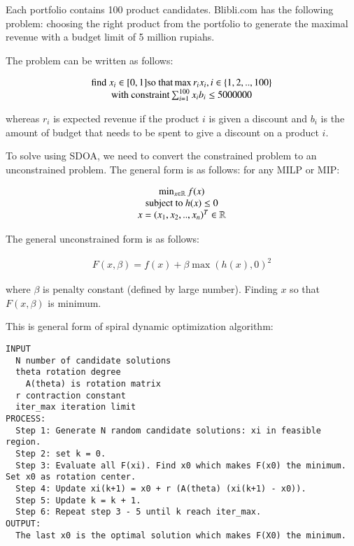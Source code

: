 \documentclass[preprint, 3p,
authoryear]{elsarticle} %
\begin{document}
Each portfolio contains 100 product candidates. Blibli.com has the
following problem: choosing the right product from the portfolio to
generate the maximal revenue with a budget limit of 5 million rupiahs.

The problem can be written as follows:

\begin{align}
\begin{matrix} 
\text{find }x_i \in [0,1] \space \text{so that} \space \max{r_i x_i}, \space i \in \{1,2,..,100\} \\
\text{with constraint} \space \sum_{i = 1}^{100}x_i b_i \leq 5000000
\end{matrix} 
\end{align}

whereas \(r_i\) is expected revenue if the product \(i\) is given a
discount and \(b_i\) is the amount of budget that needs to be spent to
give a discount on a product \(i\).

To solve using SDOA, we need to convert the constrained problem to an
unconstrained problem. The general form is as follows: for any MILP or
MIP:

\begin{align}
\begin{matrix} 
\min_{x \in \mathbb{R}} f(x) \\
\text{subject to } \space h(x) \leq 0 \\
x = (x_1,x_2,..,x_n)^T \in \mathbb{R}
\end{matrix}
\end{align}

The general unconstrained form is as follows:

\begin{align}
F(x,\beta) = f(x) + \beta \max(h(x),0)^2
\end{align}

where \(\beta\) is penalty constant (defined by large number). Finding
\(x\) so that \(F(x,\beta)\) is minimum.

This is general form of spiral dynamic optimization algorithm:

\begin{verbatim}
INPUT
  N number of candidate solutions
  theta rotation degree
    A(theta) is rotation matrix
  r contraction constant
  iter_max iteration limit
PROCESS:
  Step 1: Generate N random candidate solutions: xi in feasible region. 
  Step 2: set k = 0.
  Step 3: Evaluate all F(xi). Find x0 which makes F(x0) the minimum. Set x0 as rotation center.
  Step 4: Update xi(k+1) = x0 + r (A(theta) (xi(k+1) - x0)).
  Step 5: Update k = k + 1.
  Step 6: Repeat step 3 - 5 until k reach iter_max.
OUTPUT:
  The last x0 is the optimal solution which makes F(X0) the minimum.
\end{verbatim}
\end{document}
